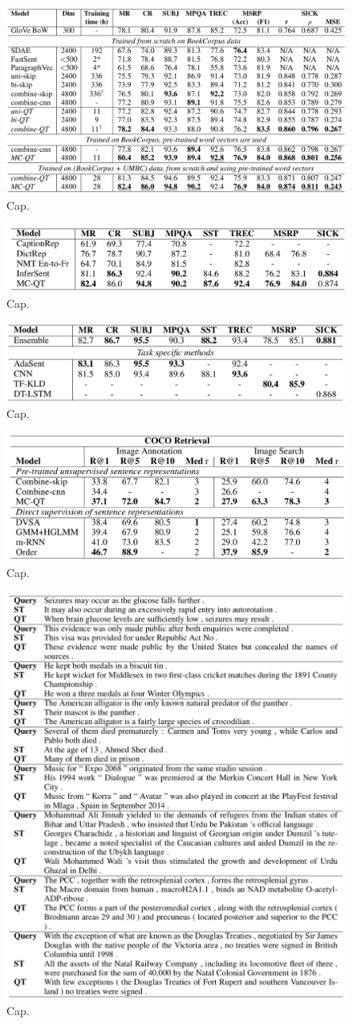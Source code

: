 \begin{figure}
\centering
  \includegraphics[width=.5\linewidth]{files/quickthoughts-2.png}
  \caption{Cap.}
  \label{fig:vae}
\end{figure}

\begin{figure}
\centering
  \includegraphics[width=.5\linewidth]{files/quickthoughts-3.png}
  \caption{Cap.}
  \label{fig:vae}
\end{figure}

\begin{figure}
\centering
  \includegraphics[width=.5\linewidth]{files/quickthoughts-4.png}
  \caption{Cap.}
  \label{fig:vae}
\end{figure}

\begin{figure}
\centering
  \includegraphics[width=.5\linewidth]{files/quickthoughts-5.png}
  \caption{Cap.}
  \label{fig:vae}
\end{figure}

\begin{figure}
\centering
  \includegraphics[width=.5\linewidth]{files/quickthoughts-6.png}
  \caption{Cap.}
  \label{fig:vae}
\end{figure}

